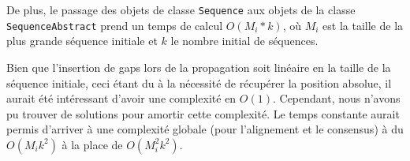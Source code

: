 De plus, le passage des objets de classe \verb|Sequence| aux objets de la classe
\verb|SequenceAbstract| prend un temps de calcul $O(M_{i} * k)$, où $M_{i}$ est
la taille de la plus grande séquence initiale et $k$ le nombre initial de
séquences.

Bien que l'insertion de gaps lors de la propagation soit
linéaire en la taille de la séquence initiale, ceci étant du à la nécessité de
récupérer la position absolue, il aurait été intéressant d'avoir une complexité
en $O(1)$. Cependant, nous n'avons pu trouver de solutions pour amortir cette
complexité. Le temps constante aurait permis d'arriver à une complexité globale
(pour l'alignement et le consensus) à du $O(M_{i} k ^{2})$ à la place de
$O(M_{i}^{2} k^{2})$.

